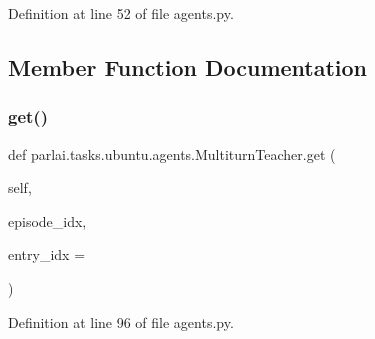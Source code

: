 Definition at line 52 of file agents.\+py.



\subsection{Member Function Documentation}
\mbox{\label{classparlai_1_1tasks_1_1ubuntu_1_1agents_1_1MultiturnTeacher_a4cd01e6122097e56524a2976f8aacfa6}} 
\subsubsection{\texorpdfstring{get()}{get()}}
{\footnotesize\ttfamily def parlai.\+tasks.\+ubuntu.\+agents.\+Multiturn\+Teacher.\+get (\begin{DoxyParamCaption}\item[{}]{self,  }\item[{}]{episode\+\_\+idx,  }\item[{}]{entry\+\_\+idx = {} }\end{DoxyParamCaption})}



Definition at line 96 of file agents.\+py.



